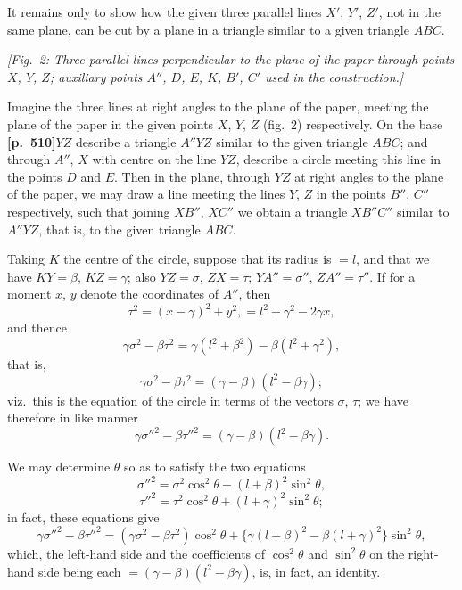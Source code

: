 \documentclass[11pt,a4paper]{article}
\begin{document}
It remains only to show how the given three parallel lines $X'$, $Y'$, $Z'$, not in the same plane, can be cut by a plane in a triangle similar to a given triangle $ABC$.

\begin{center}
\textit{[Fig.~2: Three parallel lines perpendicular to the plane of the paper through points $X$, $Y$, $Z$; auxiliary points $A''$, $D$, $E$, $K$, $B'$, $C'$ used in the construction.]}
\end{center}

Imagine the three lines at right angles to the plane of the paper, meeting the plane of the paper in the given points $X$, $Y$, $Z$ (fig.~2) respectively. On the base \noindent\textbf{[p.~510]}\quad $YZ$ describe a triangle $A''YZ$ similar to the given triangle $ABC$; and through $A''$, $X$ with centre on the line $YZ$, describe a circle meeting this line in the points $D$ and $E$. Then in the plane, through $YZ$ at right angles to the plane of the paper, we may draw a line meeting the lines $Y$, $Z$ in the points $B''$, $C''$ respectively, such that joining $XB''$, $XC''$ we obtain a triangle $XB''C''$ similar to $A''YZ$, that is, to the given triangle $ABC$.

Taking $K$ the centre of the circle, suppose that its radius is $= l$, and that we have $KY = \beta$, $KZ = \gamma$; also $YZ = \sigma$, $ZX = \tau$; $YA'' = \sigma''$, $ZA'' = \tau''$. If for a moment $x$, $y$ denote the coordinates of $A''$, then
\[
\tau^{2} = (x - \gamma)^{2} + y^{2}, = l^{2} + \gamma^{2} - 2\gamma x,
\]
and thence
\[
\gamma\sigma^{2} - \beta\tau^{2} = \gamma(l^{2} + \beta^{2}) - \beta(l^{2} + \gamma^{2}),
\]
that is,
\[
\gamma\sigma^{2} - \beta\tau^{2} = (\gamma - \beta)(l^{2} - \beta\gamma);
\]
viz.\ this is the equation of the circle in terms of the vectors $\sigma$, $\tau$; we have therefore in like manner
\[
\gamma\sigma''^{2} - \beta\tau''^{2} = (\gamma - \beta)(l^{2} - \beta\gamma).
\]

We may determine $\theta$ so as to satisfy the two equations
\[
\sigma''^{2} = \sigma^{2}\cos^{2}\theta + (l + \beta)^{2}\sin^{2}\theta,
\]
\[
\tau''^{2} = \tau^{2}\cos^{2}\theta + (l + \gamma)^{2}\sin^{2}\theta;
\]
in fact, these equations give
\[
\gamma\sigma''^{2} - \beta\tau''^{2} = (\gamma\sigma^{2} - \beta\tau^{2})\cos^{2}\theta + \{\gamma(l + \beta)^{2} - \beta(l + \gamma)^{2}\}\sin^{2}\theta,
\]
which, the left-hand side and the coefficients of $\cos^{2}\theta$ and $\sin^{2}\theta$ on the right-hand side being each $= (\gamma - \beta)(l^{2} - \beta\gamma)$, is, in fact, an identity.
\end{document}
